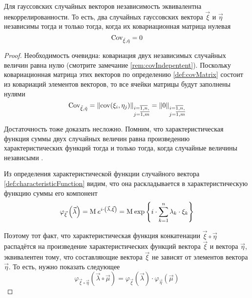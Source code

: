 \begin{theorem}
    \label{theorem:gaussianVector:independence}
    Для гауссовских случайных векторов независимость эквивалентна
    некоррелированности.
    То есть, два случайных гауссовских вектора $\vec{\xi}$ и $\vec{\eta}$
    независимы тогда и только тогда, когда их ковариационная матрица нулевая
    $$\operatorname{Cov^{}_{\vec{\xi}, \vec{\eta}}} = 0$$
\end{theorem}
\begin{proof}
    Необходимость очевидна: ковариация двух независимых случайных величин равна
    нулю (смотрите замечание \ref{rem:covIndepentent}). Поскольку
    ковариационная матрица этих векторов по определению \ref{def:covMatrix}
    состоит из ковариаций элементов векторов, то все ячейки матрицы будут
    заполнены нулями
    $$\operatorname{Cov^{}_{\vec{\xi}, \vec{\eta}}}
        = \left\| \operatorname{cov}\!\left( \xi_i, \eta_j \right) \right\|_{
            \substack{i=\overline{1,n},\\j=\overline{1,m}}}
        = \left\| 0 \right \|_{
            \substack{i=\overline{1,n},\\j=\overline{1,m}}}$$

    Достаточность тоже доказать несложно. Помним, что характеристическая
    функция суммы двух случайных величин равна произведению характеристических
    функций тогда и только тогда, когда случайные величины независыми
    \cite[с.~354]{Shiryayev1}.

    Из определения характеристической функции случайного вектора
    \ref{def:characteristicFunction} видим, что она раскладывается в
    характеристическую функцию суммы его компонент
    $$\varphi_{\vec{\xi}}\left( \vec{\lambda} \right)
        = \operatorname{M}_{} e^{i \cdot \left( \vec{\lambda}, \vec{\xi} \right)}
        = \operatorname{M}_{} 
            \exp{\left\{ i \cdot \sum_{k=1}^n \lambda_k \cdot \xi_k \right\}}$$

    Поэтому тот факт, что характеристическая функция конкатенации
    $\vec{\xi} \circ \vec{\eta}$ распадётся на произведение характеристических
    функций вектора $\vec{\xi}$ и вектора $\vec{\eta}$, эквивалентен тому, что
    составляющие вектора $\vec{\xi}$ не зависят от элементов вектора
    $\vec{\eta}$. То есть, нужно показать следующее
    $$\varphi_{\vec{\xi} \circ \vec{\eta}}\left(
            \vec{\lambda} \circ \vec{\mu} \right)
        = \varphi_{\vec{\xi}}\left( \vec{\lambda} \right)
            \cdot \varphi_{\vec{\eta}}\left( \vec{\mu} \right)$$


\end{proof}
